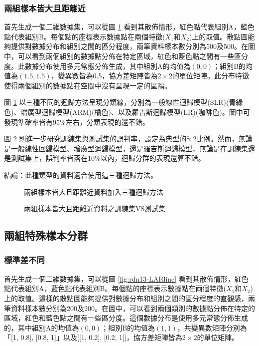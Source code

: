 \documentclass[12pt, a4paper]{article}
\begin{document}
\subsubsection{兩組樣本皆大且距離近}

首先生成一個二維數據集，可以從圖 \ref{fig:rdn12-LARline} 看到其散佈情形，紅色點代表組別A，藍色點代表組別B。每個點的座標表示數據點在兩個特徵($X_1$和$X_2$)上的取值。散點圖能夠提供對數據分布和組別之間的區分程度，兩筆資料樣本數分別為500及500。在圖中，可以看到兩個組別的數據點分佈在特定區域，紅色和藍色點之間有一些區分度。此數據分布使用多元常態分佈生成，其中組別A的均值為$(0, 0)$；組別B的均值為$(1.5, 1.5)$，變異數皆為0.5，協方差矩陣皆為$2 \times 2$的單位矩陣。此分布特徵使得兩個組別的數據點在空間中沒有呈現一定的區隔。

圖 \ref{fig:rdn12-LARline} 以三種不同的迴歸方法呈現分類線，分別為一般線性迴歸模型(SLR)(青綠色)、增廣型迴歸模型(ARM)(橘色)、以及羅吉斯迴歸模型(LR)(咖啡色)。圖中可發現準確率皆有95\%左右，分類表現的還不錯。

圖 \ref{fig:rdn12-LARline2} 則進一步研究訓練集與測試集的誤判率，設定為典型的$8:2$比例。然而，無論是一般線性回歸模型、增廣型迴歸模型，還是羅吉斯迴歸模型，無論是在訓練集還是測試集上，誤判率皆落在10\%以內，迴歸分群的表現還算不錯。

結論：此種類型的資料適合使用這三種迴歸方法。
\begin{figure}[H]
    \caption{兩組樣本皆大且距離近資料加入三種迴歸方法}
    \label{fig:rdn12-LARline}
\end{figure}
\begin{figure}[H]
    \caption{兩組樣本皆大且距離近資料之訓練集VS測試集}
    \label{fig:rdn12-LARline2}
\end{figure}
\subsection{兩組特殊樣本分群}
\subsubsection{標準差不同}
首先生成一個二維數據集，可以從圖 \ref{fig:rdn13-LARline} 看到其散佈情形，紅色點代表組別A，藍色點代表組別B。每個點的座標表示數據點在兩個特徵($X_1$和$X_2$)上的取值。這樣的散點圖能夠提供對數據分布和組別之間的區分程度的直觀感，兩筆資料樣本數分別為200及200。在圖中，可以看到兩個類別的數據點分佈在特定的區域，紅色和藍色點之間有一些區分度。這個數據分布是使用多元常態分佈生成的，其中組別A的均值為$(0, 0)$；組別B的均值為$(1, 1)$，共變異數矩陣分別為「[1, 0.8], [0.8, 1]」以及[[1, 0.2], [0.2, 1]]，協方差矩陣皆為$2 \times 2$的單位矩陣。
\end{document}
